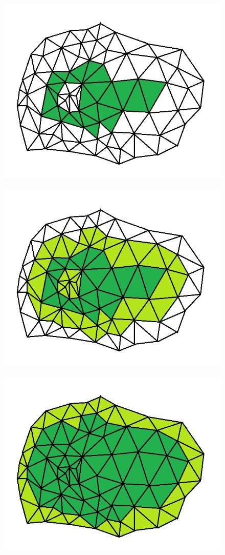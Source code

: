 \documentclass[12pt, twoside]{article}
\begin{document}
\begin{figure}[h]
\centering
\includegraphics[scale=0.3]{Dila1.jpg}~\includegraphics[scale=0.3]{Dila2.jpg}~\includegraphics[scale=0.3]{Dila3.jpg}


\end{figure}
\end{document}
